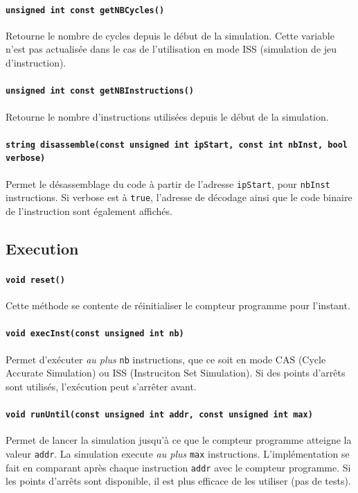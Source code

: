 \paragraph{\texttt{unsigned int const getNBCycles()}} Retourne le nombre de cycles depuis le début de la simulation. Cette variable n'est pas actualisée dans le cas de l'utilisation en mode ISS (simulation de jeu d'instruction).
\paragraph{\texttt{unsigned int const getNBInstructions()}} Retourne le nombre d'instructions utilisées depuis le début de la simulation.
\paragraph{\texttt{string disassemble(const unsigned int ipStart, const int nbInst, bool verbose)}} Permet le désassemblage du code à partir de l'adresse \texttt{ipStart}, pour \texttt{nbInst} instructions. Si verbose est à \texttt{true}, l'adresse de décodage ainsi que le code binaire de l'instruction sont également affichés.

\subsection{Execution}
\paragraph{\texttt{void reset()}}
Cette méthode se contente de réinitialiser le compteur programme pour l'instant.

\paragraph{\texttt{void execInst(const unsigned int nb)}} Permet d'exécuter \emph{au plus} \texttt{nb} instructions, que ce soit en mode CAS (Cycle Accurate Simulation) ou ISS (Instruciton Set Simulation). Si des points d'arrêts sont utilisés, l'exécution peut s'arrêter avant.

\paragraph{\texttt{void runUntil(const unsigned int addr, const unsigned int max)}} Permet de lancer la simulation jusqu'à ce que le compteur programme atteigne la valeur \texttt{addr}. La simulation execute \emph{au plus} \texttt{max} instructions. L'implémentation se fait en comparant après chaque instruction \texttt{addr} avec le compteur programme. Si les points d'arrêts sont disponible, il est plus efficace de les utiliser (pas de tests).


